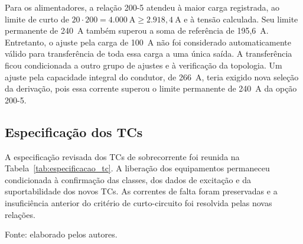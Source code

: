Para os alimentadores, a relação 200-5 atendeu à maior carga registrada, ao limite de curto de $20\cdot200=4.000~\text{A}\geq2.918{,}4~\text{A}$ e à tensão calculada. Seu limite permanente de 240~A também superou a soma de referência de 195,6~A. Entretanto, o ajuste pela carga de 100~A não foi considerado automaticamente válido para transferência de toda essa carga a uma única saída. A transferência ficou condicionada a outro grupo de ajustes e à verificação da topologia. Um ajuste pela capacidade integral do condutor, de 266~A, teria exigido nova seleção da derivação, pois essa corrente superou o limite permanente de 240~A da opção 200-5.

\subsection{Especificação dos TCs}

A especificação revisada dos TCs de sobrecorrente foi reunida na Tabela~\ref{tab:especificacao_tc}. A liberação dos equipamentos permaneceu condicionada à confirmação das classes, dos dados de excitação e da suportabilidade dos novos TCs. As correntes de falta foram preservadas e a insuficiência anterior do critério de curto-circuito foi resolvida pelas novas relações.

\begin{table}[htbp]
    \centering
    \caption{Especificação dos TCs de proteção de sobrecorrente da SE Campus do Pici.}
    \label{tab:especificacao_tc}
    \par\vspace{2pt}
    {\small Fonte: elaborado pelos autores.}
\end{table}
